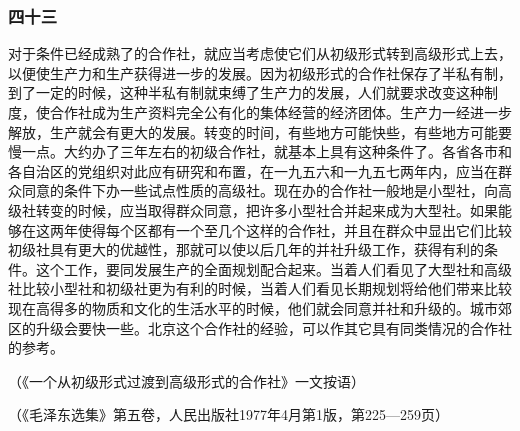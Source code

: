 \documentclass[cn,11pt,chinese]{elegantbook}
\def\myformat#1{\hfil\hfil #1}
\begin{document}
\subsubsection*{\myformat{四十三}}
对于条件已经成熟了的合作社，就应当考虑使它们从初级形式转到高级形式上去，以便使生产力和生产获得进一步的发展。因为初级形式的合作社保存了半私有制，到了一定的时候，这种半私有制就束缚了生产力的发展，人们就要求改变这种制度，使合作社成为生产资料完全公有化的集体经营的经济团体。生产力一经进一步解放，生产就会有更大的发展。转变的时间，有些地方可能快些，有些地方可能要慢一点。大约办了三年左右的初级合作社，就基本上具有这种条件了。各省各市和各自治区的党组织对此应有研究和布置，在一九五六和一九五七两年内，应当在群众同意的条件下办一些试点性质的高级社。现在办的合作社一般地是小型社，向高级社转变的时候，应当取得群众同意，把许多小型社合并起来成为大型社。如果能够在这两年使得每个区都有一个至几个这样的合作社，并且在群众中显出它们比较初级社具有更大的优越性，那就可以使以后几年的并社升级工作，获得有利的条件。这个工作，要同发展生产的全面规划配合起来。当着人们看见了大型社和高级社比较小型社和初级社更为有利的时候，当着人们看见长期规划将给他们带来比较现在高得多的物质和文化的生活水平的时候，他们就会同意并社和升级的。城市郊区的升级会要快一些。北京这个合作社的经验，可以作其它具有同类情况的合作社的参考。\\
\begin{flushright}（《一个从初级形式过渡到高级形式的合作社》一文按语）\end{flushright}
\begin{flushright}
（《毛泽东选集》第五卷，人民出版社1977年4月第1版，第225—259页）
\end{flushright}




\newpage
\end{document}

